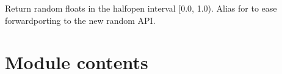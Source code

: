 \documentclass[letterpaper,10pt,english]{sphinxmanual}
\begin{document}
\begin{fulllineitems}
\label{\detokenize{myfpga:myfpga.sim_lut.numDerivative}}
\pysigstartsignatures
{}
\pysigstopsignatures
\end{fulllineitems}


\begin{fulllineitems}
\label{\detokenize{myfpga:myfpga.sim_lut.random}}
\pysigstartsignatures
{}
\pysigstopsignatures
\sphinxAtStartPar
Return random floats in the half\sphinxhyphen{}open interval {[}0.0, 1.0). Alias for
 to ease forward\sphinxhyphen{}porting to the new random API.

\end{fulllineitems}



\section{Module contents}
\label{\detokenize{myfpga:module-myfpga}}\label{\detokenize{myfpga:module-contents}}
\end{document}
